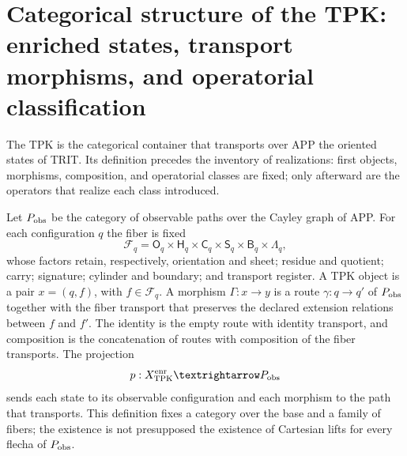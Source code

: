 \section{Categorical structure of the TPK: enriched states, transport
morphisms, and operatorial classification}
\label{sec:arbol-operatorio-tpk-rev11}

The TPK is the categorical container that transports over APP the
oriented states of TRIT. Its definition precedes the inventory of realizations:
first objects, morphisms, composition, and operatorial classes are fixed; only
afterward are the operators that realize each class introduced.

\begin{definition}
\label{def:estado-enriquecido-tpk-rev11}
Let \(\mathsf P_{\rm obs}\) be the category of observable paths over the Cayley
graph of APP. For each configuration \(q\) the fiber is fixed
\[
 \mathcal F_q=
 \mathsf O_q\times\mathsf H_q\times\mathsf C_q\times
 \mathsf S_q\times\mathsf B_q\times\mathsf\Lambda_q,
\]
whose factors retain, respectively, orientation and sheet; residue and
quotient; carry; signature; cylinder and boundary; and transport register. A
TPK object is a pair \(x=(q,f)\), with \(f\in\mathcal F_q\). A morphism
\(\Gamma:x\to y\) is a route \(\gamma:q\to q'\) of
\(\mathsf P_{\rm obs}\) together with the fiber transport that preserves the
declared extension relations between \(f\) and \(f'\). The identity is the
empty route with identity transport, and composition is the concatenation of
routes with composition of the fiber transports. The projection
\[
 p:\mathcal X_{\rm TPK}^{\rm enr}\longrightarrow\mathsf P_{\rm obs}
\]
sends each state to its observable configuration and each morphism to the path that
transports. This definition fixes a category over the base and a family of
fibers; the existence is not presupposed the existence of Cartesian lifts for every
flecha of \(\mathsf P_{\rm obs}\).
\end{definition}


